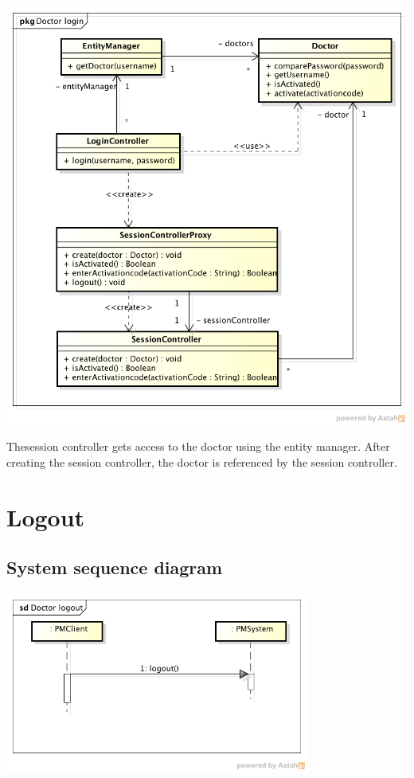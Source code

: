\documentclass[fontsize=12pt,
               paper=a4,
               twoside=false,
               parskip=half,
               ]{scrartcl}
\begin{document}
\includegraphics[width=15cm]{./img/design-class-diagrams/doctor-login.png}

Thesession controller gets access to the doctor using the entity manager. After creating the session controller, the doctor is referenced by the session controller.

\section{Logout}

\subsection{System sequence diagram}

\includegraphics[width=10cm]{./img/system-sequence-diagrams/doctor-logout.png}
\end{document}

